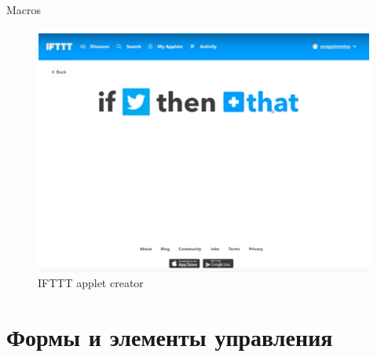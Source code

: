 \documentclass{beamer}
\begin{document}
\begin{frame}[t]{Macros}
	\begin{figure}[h]
		\centering
		\includegraphics[scale=0.6]{images/lec08-pic29.png}
		\caption{IFTTT applet creator}
	\end{figure}
\end{frame}

\section{Формы и элементы управления}

\end{document}
